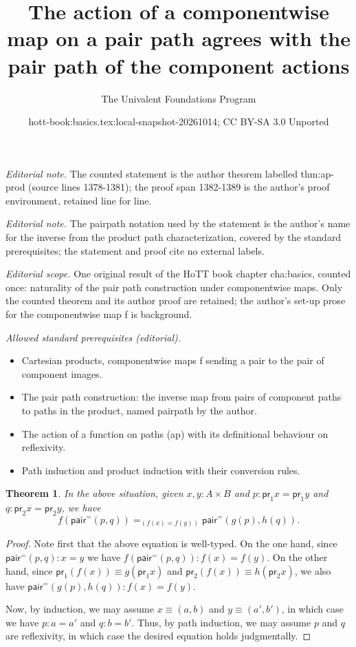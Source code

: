 \documentclass[10pt,a4paper]{article}
\title{The action of a componentwise map on a pair path agrees with the pair path of the component actions}
\author{The Univalent Foundations Program}
\date{hott-book:basics.tex:local-snapshot-20261014; CC BY-SA 3.0 Unported}
\newcounter{chapter}
\newcommand{\jdeq}{\equiv}      %
\newcommand{\proj}[1]{\ensuremath{\mathsf{pr}_{#1}}\xspace}
\newcommand{\pairpath}{\ensuremath{\mathsf{pair}^{\mathord{=}}}\xspace}
\newcommand{\id}[3][]{\ensuremath{#2 =_{#1} #3}\xspace}
\newcommand{\map}[2]{\ensuremath{{#1}\mathopen{}\left({#2}\right)\mathclose{}}\xspace}
\let\ap\map
\newtheorem{thm}{Theorem}[section]
\theoremstyle{definition}
\theoremstyle{remark}
\numberwithin{equation}{section}
\begin{document}
\maketitle
\noindent\textit{Editorial note.} The counted statement is the author theorem labelled thm:ap-prod (source lines 1378-1381); the proof span 1382-1389 is the author's proof environment, retained line for line.\par\medskip
\noindent\textit{Editorial note.} The pairpath notation used by the statement is the author's name for the inverse from the product path characterization, covered by the standard prerequisites; the statement and proof cite no external labels.\par\medskip
\noindent\textit{Editorial scope.} One original result of the HoTT book chapter cha:basics, counted once: naturality of the pair path construction under componentwise maps. Only the counted theorem and its author proof are retained; the author's set-up prose for the componentwise map f is background.\par\medskip
\noindent\textit{Allowed standard prerequisites (editorial).}\begin{itemize}
\item Cartesian products, componentwise maps f sending a pair to the pair of component images.
\item The pair path construction: the inverse map from pairs of component paths to paths in the product, named pairpath by the author.
\item The action of a function on paths (ap) with its definitional behaviour on reflexivity.
\item Path induction and product induction with their conversion rules.
\end{itemize}\medskip
\begin{thm}\label{thm:ap-prod}
  In the above situation, given $x,y:A\times B$ and $p:\proj1x=\proj1y$ and $q:\proj2x=\proj2y$, we have
  \[ \id[(f(x)=f(y))]{\ap{f}{\pairpath(p,q)}} {\pairpath(\ap{g}{p},\ap{h}{q})}. \]
\end{thm}

\begin{proof}
  Note first that the above equation is well-typed.
  On the one hand, since $\pairpath(p,q):x=y$ we have $\ap{f}{\pairpath(p,q)}:f(x)=f(y)$.
  On the other hand, since $\proj1(f(x))\jdeq g(\proj1x)$ and $\proj2(f(x))\jdeq h(\proj2x)$, we also have $\pairpath(\ap{g}{p},\ap{h}{q}):f(x)=f(y)$.

  Now, by induction, we may assume $x\jdeq(a,b)$ and $y\jdeq(a',b')$, in which case we have $p:a=a'$ and $q:b=b'$.
  Thus, by path induction, we may assume $p$ and $q$ are reflexivity, in which case the desired equation holds judgmentally.
\end{proof}
\end{document}
